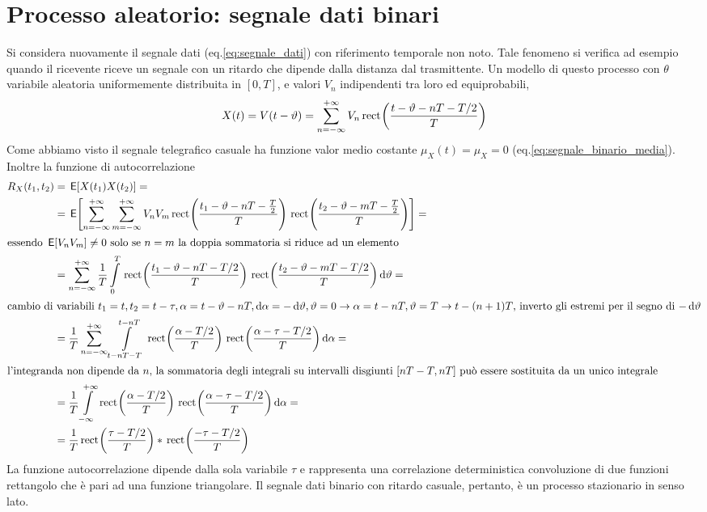 \section[Processo aleatorio con riferimento temporale aleatorio]{Processo aleatorio: segnale dati binari}
Si considera nuovamente il segnale dati (eq.\ref{eq:segnale_dati}) con riferimento temporale non noto. Tale fenomeno si verifica ad esempio quando il ricevente riceve un segnale con un ritardo che dipende dalla distanza dal trasmittente. Un modello di questo processo con $\theta$ variabile aleatoria uniformemente distribuita in $[0,T]$, e valori $V_n$ indipendenti tra loro ed equiprobabili,
\[
	X(t)=V(t-\vartheta)=\sum_{n=-\infty}^{+\infty}V_n\,{\operatorname{rect}}^{}\!\left({\frac{t-\vartheta-n T-T/2}{T}}\right)
\]
Come abbiamo visto il segnale telegrafico casuale ha funzione valor medio costante $\mu_X(t)=\mu_X=0$ (eq.\ref{eq:segnale_binario_media}).
Inoltre la funzione di autocorrelazione
\[
\begin{split}
	R_X(t_1,t_2)&=\E{X(t_1)X(t_2)}=\\
	&=\E{\sum_{n=-\infty}^{+\infty}\sum_{m=-\infty}^{+\infty}V_n V_m\rect{\frac{t_1-\theta-n T-\frac{T}{2}}{T}}\rect{\frac{t_2-\theta-m T-\frac{T}{2}}{T}}}=\\
\intertext{essendo $\E{V_nV_m}\neq 0$ solo se $n=m$ la doppia sommatoria si riduce ad un elemento}
	&=\sum_{n=-\infty}^{+\infty}\frac{1}{T}\intd{0}{T}{\rect{\frac{t_1-\theta-n T-T/2}{T}}\rect{\frac{t_2-\theta-m T-T/2}{T}}}{\theta}=\\
\intertext{cambio di variabili $t_1=t, t_2=t-\tau, \alpha=t-\theta-n T,\diff\alpha=-\diff\theta, \theta=0\to\alpha=t-nT, \theta=T\to t-(n+1)T$, inverto gli estremi per il segno di $-\diff\theta$}
	&=\frac{1}{T}\sum_{n=-\infty}^{+\infty}\intd{t-n T-T}{t-n T}{\rect{\frac{\alpha-T/2}{T}}\rect{\frac{\alpha-\tau-T/2}{T}}}{\alpha}=\\
\intertext{l'integranda non dipende da $n$, la sommatoria degli integrali su intervalli disgiunti $[n T-T,n T]$ può essere sostituita da un unico integrale}
	&=\frac{1}{T}\intd{-\infty}{+\infty}{\rect{\frac{\alpha-T/2}{T}}\rect{\frac{\alpha-\tau-T/2}{T}}}{\alpha}=\\
	&=\frac{1}{T}\rect{\frac{\tau-T/2}{T}}\ast\rect{\frac{-\tau-T/2}{T}}
\end{split}
\]
La funzione autocorrelazione dipende dalla sola variabile $\tau$ e rappresenta una correlazione deterministica convoluzione di due funzioni rettangolo che è pari ad una funzione triangolare.
Il segnale dati binario con ritardo casuale, pertanto, è un processo stazionario in senso lato.

